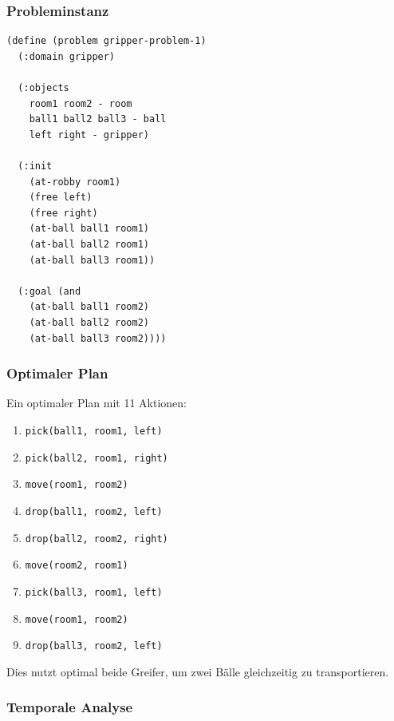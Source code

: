 ﻿\documentclass[a4paper,12pt]{article}
\theoremstyle{definition}
\begin{document}
\subsubsection{Probleminstanz}

\begin{lstlisting}[language=PDDL, caption=Gripper Problem]
(define (problem gripper-problem-1)
  (:domain gripper)
  
  (:objects
    room1 room2 - room
    ball1 ball2 ball3 - ball
    left right - gripper)
  
  (:init
    (at-robby room1)
    (free left)
    (free right)
    (at-ball ball1 room1)
    (at-ball ball2 room1)
    (at-ball ball3 room1))
  
  (:goal (and
    (at-ball ball1 room2)
    (at-ball ball2 room2)
    (at-ball ball3 room2))))
\end{lstlisting}

\subsubsection{Optimaler Plan}

Ein optimaler Plan mit 11 Aktionen:

\begin{enumerate}
	\item \texttt{pick(ball1, room1, left)}
	\item \texttt{pick(ball2, room1, right)}
	\item \texttt{move(room1, room2)}
	\item \texttt{drop(ball1, room2, left)}
	\item \texttt{drop(ball2, room2, right)}
	\item \texttt{move(room2, room1)}
	\item \texttt{pick(ball3, room1, left)}
	\item \texttt{move(room1, room2)}
	\item \texttt{drop(ball3, room2, left)}
\end{enumerate}

Dies nutzt optimal beide Greifer, um zwei Bälle gleichzeitig zu transportieren.

\subsubsection{Temporale Analyse}
\end{document}
